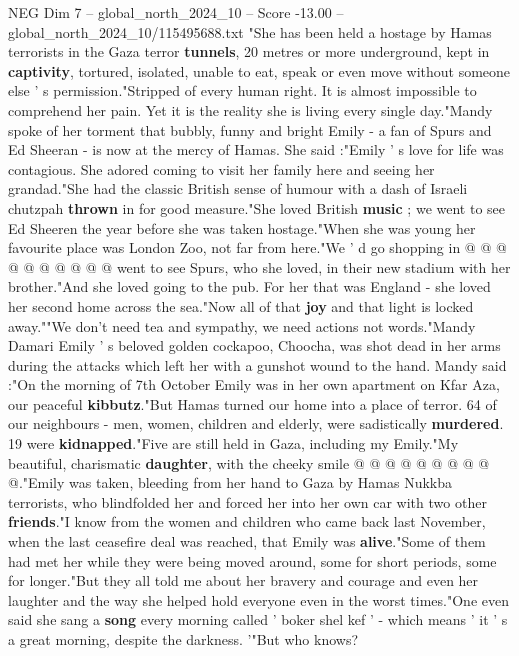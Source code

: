 \begin{textsample}{NEG Dim 7 – global\_north\_2024\_10 – Score -13.00 – global\_north\_2024\_10/115495688.txt}  \label{ex:f7_neg_032}
"She has been held a hostage by Hamas terrorists in the Gaza terror \textbf{tunnels}, 20 metres or more underground, kept in \textbf{captivity}, tortured, isolated, unable to eat, speak or even move without someone else ' s permission."Stripped of every human right.
It is almost impossible to comprehend her pain.
Yet it is the reality she is living every single day."Mandy spoke of her torment that bubbly, funny and bright Emily - a fan of Spurs and Ed Sheeran - is now at the mercy of Hamas.
She said :"Emily ' s love for life was contagious.
She adored coming to visit her family here and seeing her grandad."She had the classic British sense of humour with a dash of Israeli chutzpah \textbf{thrown} in for good measure."She loved British \textbf{music} ; we went to see Ed Sheeren the year before she was taken hostage."When she was young her favourite place was London Zoo, not far from here."We ' d go shopping in @ @ @ @ @ @ @ @ @ @ went to see Spurs, who she loved, in their new stadium with her brother."And she loved going to the pub.
For her that was England - she loved her second home across the sea."Now all of that \textbf{joy} and that light is locked away.""We don't need tea and sympathy, we need actions not words."Mandy Damari Emily ' s beloved golden cockapoo, Choocha, was shot dead in her arms during the attacks which left her with a gunshot wound to the hand.
Mandy said :"On the morning of 7th October Emily was in her own apartment on Kfar Aza, our peaceful \textbf{kibbutz}."But Hamas turned our home into a place of terror. 64 of our neighbours - men, women, children and elderly, were sadistically \textbf{murdered}. 19 were \textbf{kidnapped}."Five are still held in Gaza, including my Emily."My beautiful, charismatic \textbf{daughter}, with the cheeky smile @ @ @ @ @ @ @ @ @ @."Emily was taken, bleeding from her hand to Gaza by Hamas Nukkba terrorists, who blindfolded her and forced her into her own car with two other \textbf{friends}."I know from the women and children who came back last November, when the last ceasefire deal was reached, that Emily was \textbf{alive}."Some of them had met her while they were being moved around, some for short periods, some for longer."But they all told me about her bravery and courage and even her laughter and the way she helped hold everyone even in the worst times."One even said she sang a \textbf{song} every morning called ' boker shel kef ' - which means ' it ' s a great morning, despite the darkness. '"But who knows?

\end{textsample}
